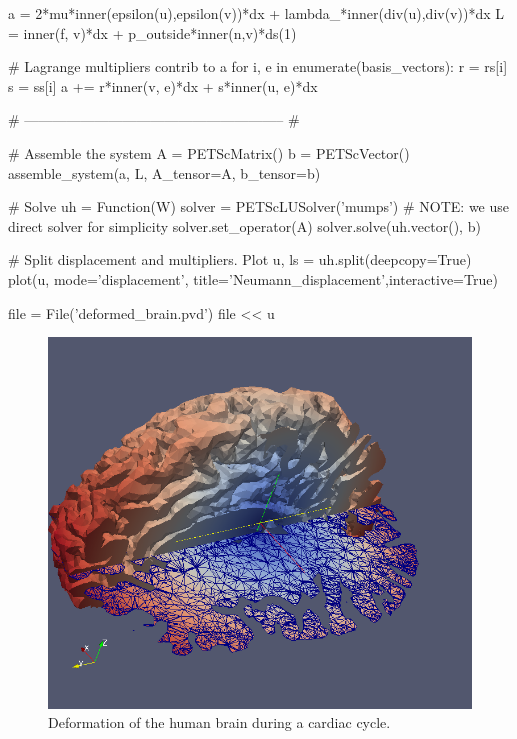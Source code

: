 \begin{example}
\begin{python}
a = 2*mu*inner(epsilon(u),epsilon(v))*dx + lambda_*inner(div(u),div(v))*dx
L = inner(f, v)*dx + p_outside*inner(n,v)*ds(1)

# Lagrange multipliers contrib to a
for i, e in enumerate(basis_vectors):
	r = rs[i]
	s = ss[i]
	a += r*inner(v, e)*dx + s*inner(u, e)*dx

# -------------------------------------------------------- #

# Assemble the system
A = PETScMatrix()
b = PETScVector()
assemble_system(a, L, A_tensor=A, b_tensor=b)

# Solve
uh = Function(W)
solver = PETScLUSolver('mumps') # NOTE: we use direct solver for simplicity
solver.set_operator(A)
solver.solve(uh.vector(), b)

# Split displacement and multipliers. Plot
u, ls = uh.split(deepcopy=True) 
plot(u, mode='displacement', title='Neumann_displacement',interactive=True)

file = File('deformed_brain.pvd')
file << u 

\end{python}
\end{example}

\begin{figure}[h!] 
\begin{center}
  \includegraphics[scale=0.25]{chapters/elasticity/screen_shot.png}
  \end{center}
\caption{Deformation of the human brain during a cardiac cycle.}
\end{figure}


